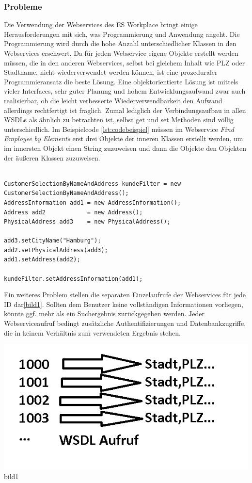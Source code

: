\subsubsection{Probleme}

Die Verwendung der Webservices des ES Workplace bringt einige Herausforderungen mit sich, was Programmierung und Anwendung
angeht. Die Programmierung wird durch die hohe Anzahl unterschiedlicher Klassen in den Webservices erschwert. Da für jeden
Webservice eigene Objekte erstellt werden müssen, die in den anderen Webservices, selbst bei gleichem Inhalt wie PLZ oder
Stadtname, nicht wiederverwendet werden können, ist eine prozeduraler Programmieransatz die beste Lösung. Eine objektorientierte 
Lösung ist mittels vieler Interfaces, sehr guter Planung und hohem Entwicklungsaufwand zwar auch realisierbar, ob die leicht 
verbesserte Wiederverwendbarkeit den Aufwand allerdings rechtfertigt ist fraglich. Zumal lediglich der Verbindungsaufbau in allen
WSDLs als ähnlich zu betrachten ist, selbst get und set Methoden sind völlig unterschiedlich. Im Beispielcode \ref{lst:codebeispiel}
müssen im Webservice \emph{Find Employee by Elements} erst drei Objekte der inneren Klassen erstellt werden, um im  innersten Objekt 
einen String zuzuweisen und dann die Objekte den Objekten der äußeren Klassen zuzuweisen.

\begin{lstlisting}[float=h!t]

CustomerSelectionByNameAndAddress kundeFilter = new CustomerSelectionByNameAndAddress();
AddressInformation add1 = new AddressInformation();
Address add2            = new Address();
PhysicalAddress add3    = new PhysicalAddress();

add3.setCityName("Hamburg");
add2.setPhysicalAddress(add3);
add1.setAddress(add2);

kundeFilter.setAddressInformation(add1);

\end{lstlisting} 


Ein weiteres Problem stellen die separaten Einzelaufrufe der Webservices für jede ID dar\ref{bild1}. Sollten dem Benutzer keine
vollständigen Informationen vorliegen, könnte ggf. mehr als ein Suchergebnis zurückgegeben werden. Jeder Webserviceaufruf bedingt 
zusätzliche Authentifizierungen und Datenbankzugriffe, die in keinem Verhältnis zum verwendeten Ergebnis stehen.

\includegraphics[width=\textheight]{Bilder/presi1.png}{bild1} 


